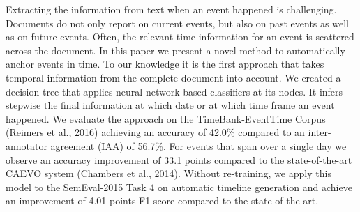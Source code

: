 Extracting the information from text when an event happened is challenging. Documents do not only report on current events, but also on past events as well as on future events. Often, the relevant time information for an event is scattered across the document. In this paper we present a novel method to automatically anchor events in time. To our knowledge it is the first approach that takes temporal information from the complete document into account. We created a decision tree that applies neural network based classifiers at its nodes. It infers stepwise the final information at which date or at which time frame an event happened. We evaluate the approach on the TimeBank-EventTime Corpus (Reimers et al., 2016)  achieving an accuracy of 42.0\% compared to an inter-annotator agreement (IAA) of 56.7\%. For events that span over a single day we observe an accuracy improvement of 33.1 points compared to the state-of-the-art CAEVO system (Chambers et al., 2014). Without re-training, we apply this model to the SemEval-2015 Task 4 on automatic timeline generation and achieve an improvement of 4.01 points F1-score compared to the state-of-the-art.
